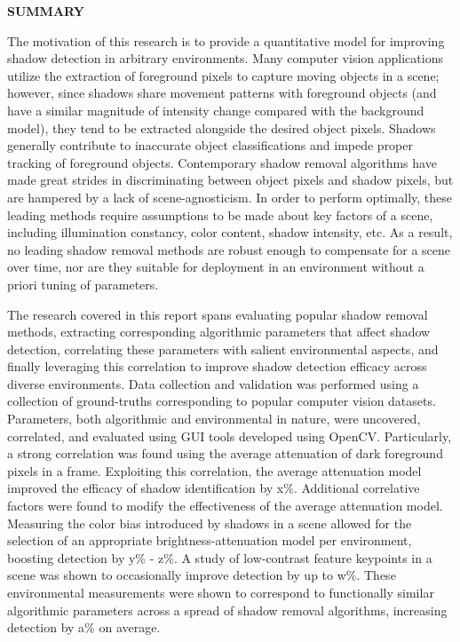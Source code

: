 \documentclass[12pt]{report}
\begin{document}
\doublespacing

\clearpage
\begin{centering}
\textbf{SUMMARY}\\
\vspace{\baselineskip}
\end{centering}

The motivation of this research is to provide a quantitative model for improving shadow detection in arbitrary environments. Many computer vision applications utilize the extraction of foreground pixels to capture moving objects in a scene; however, since shadows share movement patterns with foreground objects (and have a similar magnitude of intensity change compared with the background model), they tend to be extracted alongside the desired object pixels. Shadows generally contribute to inaccurate object classifications and impede proper tracking of foreground objects. Contemporary shadow removal algorithms have made great strides in discriminating between object pixels and shadow pixels, but are hampered by a lack of scene-agnosticism. In order to perform optimally, these leading methods require assumptions to be made about key factors of a scene, including illumination constancy, color content, shadow intensity, etc. As a result, no leading shadow removal methods are robust enough to compensate for a scene over time, nor are they suitable for deployment in an environment without a priori tuning of parameters.

The research covered in this report spans evaluating popular shadow removal methods, extracting corresponding algorithmic parameters that affect shadow detection, correlating these parameters with salient environmental aspects, and finally leveraging this correlation to improve shadow detection efficacy across diverse environments. Data collection and validation was performed using a collection of ground-truths corresponding to popular computer vision datasets. Parameters, both algorithmic and environmental in nature, were uncovered, correlated, and evaluated using GUI tools developed using OpenCV. Particularly, a strong correlation was found using the average attenuation of dark foreground pixels in a frame. Exploiting this correlation, the average attenuation model improved the efficacy of shadow identification by x\%. Additional correlative factors were found to modify the effectiveness of the average attenuation model. Measuring the color bias introduced by shadows in a scene allowed for the selection of an appropriate brightness-attenuation model per environment, boosting detection by y\% - z\%. A study of low-contrast feature keypoints in a scene was shown to occasionally improve detection by up to w\%. These environmental measurements were shown to correspond to functionally similar algorithmic parameters across a spread of shadow removal algorithms, increasing detection by a\% on average.

\end{document}
